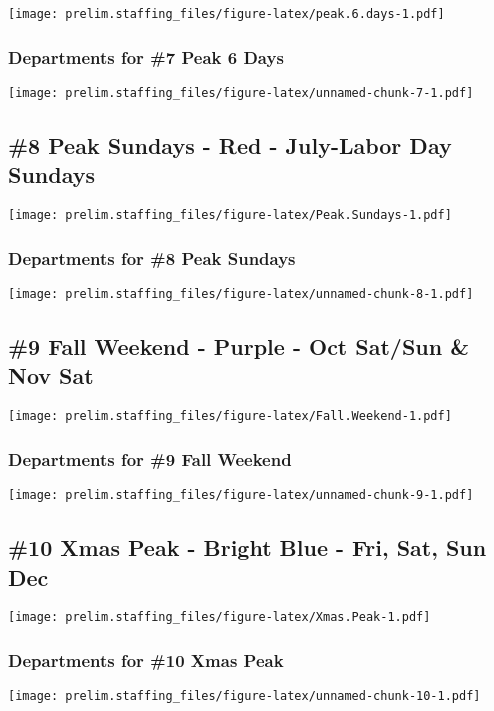 \documentclass[]{article}
\begin{document}
\texttt{[image: prelim.staffing\_files/figure-latex/peak.6.days-1.pdf]}

\subsubsection{Departments for \#7 Peak 6
Days}\label{departments-for-7-peak-6-days}

\texttt{[image: prelim.staffing\_files/figure-latex/unnamed-chunk-7-1.pdf]}

\subsection{\#8 Peak Sundays - Red - July-Labor Day
Sundays}\label{peak-sundays---red---july-labor-day-sundays}

\texttt{[image: prelim.staffing\_files/figure-latex/Peak.Sundays-1.pdf]}

\subsubsection{Departments for \#8 Peak
Sundays}\label{departments-for-8-peak-sundays}

\texttt{[image: prelim.staffing\_files/figure-latex/unnamed-chunk-8-1.pdf]}

\subsection{\#9 Fall Weekend - Purple - Oct Sat/Sun \& Nov
Sat}\label{fall-weekend---purple---oct-satsun-nov-sat}

\texttt{[image: prelim.staffing\_files/figure-latex/Fall.Weekend-1.pdf]}

\subsubsection{Departments for \#9 Fall
Weekend}\label{departments-for-9-fall-weekend}

\texttt{[image: prelim.staffing\_files/figure-latex/unnamed-chunk-9-1.pdf]}

\subsection{\#10 Xmas Peak - Bright Blue - Fri, Sat, Sun
Dec}\label{xmas-peak---bright-blue---fri-sat-sun-dec}

\texttt{[image: prelim.staffing\_files/figure-latex/Xmas.Peak-1.pdf]}

\subsubsection{Departments for \#10 Xmas
Peak}\label{departments-for-10-xmas-peak}

\texttt{[image: prelim.staffing\_files/figure-latex/unnamed-chunk-10-1.pdf]}
\end{document}
